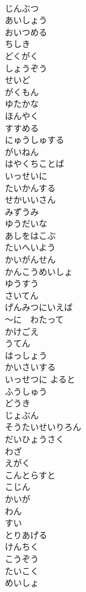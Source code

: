 \documentclass[8pt]{extreport}
\begin{document}
\begin{CJK}{UTF8}{min}
\\	じんぶつ
\\	あいしょう
\\	おいつめる
\\	ちしき
\\	どくがく
\\	しょうぞう
\\	せいど
\\	がくもん
\\	ゆたかな
\\	ほんやく
\\	すすめる
\\	にゅうしゅする
\\	がいねん
\\	はやくちことば
\\	いっせいに
\\	たいかんする
\\	せかいいさん
\\	みずうみ
\\	ゆうだいな
\\	あしをはこぶ
\\	たいへいよう
\\	かいがんせん
\\	かんこうめいしょ
\\	ゆうすう
\\	さいてん
\\	げんみつにいえば
\\	～に　わたって
\\	かけごえ
\\	うてん
\\	はっしょう
\\	かいさいする
\\	いっせつに よると
\\	ふうしゅう
\\	どうき
\\	じょぶん
\\	そうたいせいりろん
\\	だいひょうさく
\\	わざ
\\	えがく
\\	こんとらすと
\\	こじん
\\	かいが
\\	わん
\\	すい
\\	とりあげる
\\	けんちく
\\	こうぞう
\\	たいこく
\\	めいしょ

\end{CJK}
\end{document}
